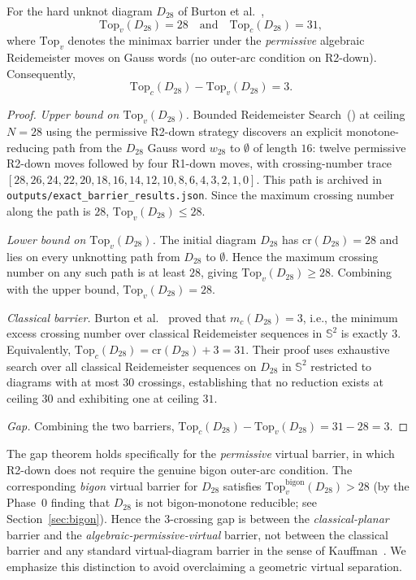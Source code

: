 
\begin{theorem}\label{thm:gap}
For the hard unknot diagram $D_{28}$ of Burton et al.\
\cite{Burton2020Hard},
\[
  \mathrm{Top}_{v}(D_{28}) = 28
  \quad\text{and}\quad
  \mathrm{Top}_{c}(D_{28}) = 31,
\]
where $\mathrm{Top}_{v}$ denotes the minimax barrier under the
\emph{permissive} algebraic Reidemeister moves on Gauss words (no
outer-arc condition on R2-down). Consequently,
\[
  \mathrm{Top}_{c}(D_{28}) - \mathrm{Top}_{v}(D_{28}) = 3.
\]
\end{theorem}

\begin{proof}
\emph{Upper bound on $\mathrm{Top}_{v}(D_{28})$.}
Bounded Reidemeister Search~(\BRS) at ceiling $N = 28$ using the
permissive R2-down strategy discovers an explicit monotone-reducing
path from the $D_{28}$ Gauss word $w_{28}$ to $\emptyset$ of length
$16$: twelve permissive R2-down moves followed by four R1-down moves,
with crossing-number trace $[28, 26, 24, 22, 20, 18, 16, 14, 12, 10,
8, 6, 4, 3, 2, 1, 0]$. This path is archived in
\texttt{outputs/exact\_barrier\_results.json}. Since the maximum
crossing number along the path is $28$,
$\mathrm{Top}_{v}(D_{28}) \leq 28$.

\emph{Lower bound on $\mathrm{Top}_{v}(D_{28})$.}
The initial diagram $D_{28}$ has $\mathrm{cr}(D_{28}) = 28$ and lies
on every unknotting path from $D_{28}$ to $\emptyset$. Hence the
maximum crossing number on any such path is at least $28$, giving
$\mathrm{Top}_{v}(D_{28}) \geq 28$. Combining with the upper bound,
$\mathrm{Top}_{v}(D_{28}) = 28$.

\emph{Classical barrier.}
Burton et al.~\cite[Theorem in Section~3]{Burton2020Hard} proved that
$m_{c}(D_{28}) = 3$, i.e., the minimum excess crossing number over
classical Reidemeister sequences in $\mathbb{S}^{2}$ is exactly $3$.
Equivalently, $\mathrm{Top}_{c}(D_{28}) = \mathrm{cr}(D_{28}) + 3 = 31$.
Their proof uses exhaustive search over all classical Reidemeister
sequences on $D_{28}$ in $\mathbb{S}^{2}$ restricted to diagrams with
at most $30$ crossings, establishing that no reduction exists at
ceiling $30$ and exhibiting one at ceiling $31$.

\emph{Gap.} Combining the two barriers,
$\mathrm{Top}_{c}(D_{28}) - \mathrm{Top}_{v}(D_{28}) = 31 - 28 = 3$.
\end{proof}

\begin{remark}
The gap theorem holds specifically for the \emph{permissive} virtual
barrier, in which R2-down does not require the genuine bigon
outer-arc condition. The corresponding \emph{bigon} virtual barrier
for $D_{28}$ satisfies $\mathrm{Top}_{v}^{\mathrm{bigon}}(D_{28}) > 28$
(by the Phase~0 finding that $D_{28}$ is not bigon-monotone
reducible; see Section~\ref{sec:bigon}). Hence the $3$-crossing gap
is between the \emph{classical-planar} barrier and the
\emph{algebraic-permissive-virtual} barrier, not between the
classical barrier and any standard virtual-diagram barrier in the
sense of Kauffman~\cite{Kauffman1999Virtual}. We emphasize this
distinction to avoid overclaiming a geometric virtual separation.
\end{remark}
